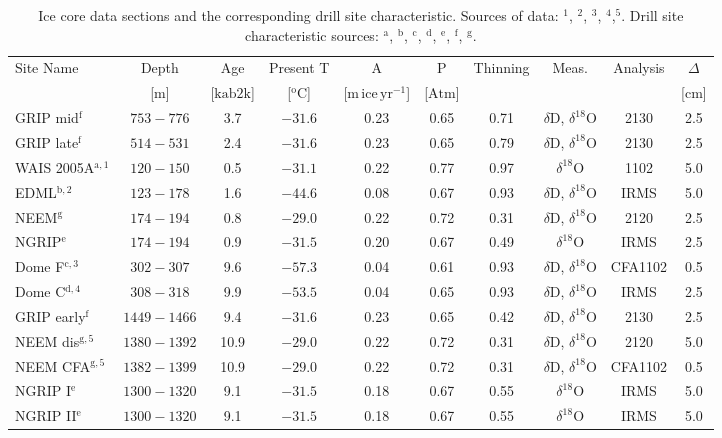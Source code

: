 \documentclass[11pt, draftcls, onecolumn]{IEEEtran} %
\numberwithin{equation}{section}
\numberwithin{table}{section}
\numberwithin{figure}{section}
\begin{document}
\begin{table}
\center
	\caption{Ice core data sections and the corresponding drill site characteristic. Sources of data: \citep{Steig2013}$^\mathrm{1}$, 
		\citep{Oerter2004}$^\mathrm{2}$, \citep{Svensson2015}$^\mathrm{3}$, \citep{Gkinis2011b}$^\mathrm{4}$,\citep{Gkinis2011}$^\mathrm{5}$. Drill site characteristic sources:		
		\citep{Bantaetal2008}$^\mathrm{a}$, \citep{Oerter2004,Veres2013}$^\mathrm{b}$, \citep{Watanabeetal2003,Kawamuraetal2003}$^\mathrm{c}$,
			\citep{Lorius1979}$^\mathrm{d}$, \citep{NGRIPmembers2004,Gkinis2014}$^\mathrm{e}$, \citep{Johnsen2000}$^\mathrm{f}$, \citep{Guillevic2013,Rasmussen2013}$^\mathrm{g}$.
		 }\label{tbl:drill_sites}
	\begin{tabular}{l c c c c c c c c c} 
		\toprule
		Site Name &Depth & Age  & Present T  &
		 A & P & Thinning& Meas. & Analysis&$\Delta$\\
		 &[$\mathrm{m}$]&[$\mathrm{ka b2k}$]&[$^\mathrm{o}\mathrm{C}$]& [$\mathrm{m \, ice \, yr^{-1}}$]&
		  [$\mathrm{Atm}$]& & &&[$\mathrm{cm}$]\\
		\midrule
		GRIP mid$^\mathrm{f}$&$753-776$ & 3.7 &$-31.6 $ & 0.23 & 0.65 & 0.71&$\delta$D, $\delta^{18}$O&2130&2.5\\
		GRIP late$^\mathrm{f}$&$514-531$  &2.4 &$-31.6 $ &0.23 & 0.65  &  0.79&$\delta$D, $\delta^{18}$O&2130&2.5\\	
		WAIS 2005A$^\mathrm{a,1}$ &$120-150$  & 0.5 & $-31.1$ &0.22 & 0.77 & 0.97 &  	 $\delta^{18}$O&1102&5.0\\
		EDML$^\mathrm{b,2}$ & $123-178$&1.6&$-44.6$ & 0.08 & 0.67 & 0.93&$\delta$D, $\delta^{18}$O&IRMS&5.0\\		
		NEEM$^\mathrm{g}$&$174-194 $&0.8 &$-29.0$ & 0.22 &  0.72 &  0.31&$\delta$D, $\delta^{18}$O&2120&2.5\\       
		NGRIP$^\mathrm{e}$ &$174-194$ &0.9 &$-31.5$ & 0.20 & 0.67  & 0.49& $\delta^{18}$O&IRMS&2.5\\			
		Dome F$^\mathrm{c,3}$& $302-307$& 9.6 & $-57.3$ &0.04 & 0.61  &  0.93 &$\delta$D, $\delta^{18}$O&CFA1102&0.5\\
		Dome C$^\mathrm{d,4}$ &$308-318$ & 9.9 &$-53.5 $ &0.04 & 0.65 &   0.93&$\delta$D, $\delta^{18}$O&IRMS&2.5\\
		GRIP early$^\mathrm{f}$&$1449-1466$ & 9.4 &$-31.6 $ & 0.23 & 0.65  &  0.42&$\delta$D, $\delta^{18}$O&2130&2.5\\
		NEEM dis$^\mathrm{g,5}$ &$1380-1392 $&10.9 &$-29.0$ & 0.22 &  0.72 &  0.31&$\delta$D, $\delta^{18}$O&2120&5.0\\       
		NEEM CFA$^\mathrm{g,5}$& $1382-1399$& 10.9 &$-29.0 $& 0.22 & 0.72  & 0.31&$\delta$D, $\delta^{18}$O&CFA1102&0.5\\			
		NGRIP I$^\mathrm{e}$&$1300-1320$ &9.1 &$-31.5$ & 0.18 & 0.67  & 0.55& $\delta^{18}$O&IRMS&5.0\\			
		NGRIP II$^\mathrm{e}$ &$1300-1320$ & 9.1 &$-31.5$ & 0.18 & 0.67  & 0.55&$\delta^{18}$O&IRMS&5.0\\				
		\bottomrule	
	\end{tabular}
\end{table}
\end{document}
